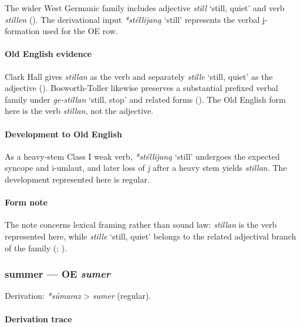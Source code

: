 \documentclass[
  british,
  a4paper,
]{article}
\providecommand{\Recon}[1]{\emph{*#1}}
\begin{document}
The wider West Germanic family includes adjective {\emph{still}} `still,
quiet' and verb \emph{stillen} (). The derivational input \Recon{stéllijaną} `still' represents the
verbal j-formation used for the OE row.

\paragraph{Old English evidence}\label{old-english-evidence-54}

Clark Hall gives \emph{stillan} as the verb and separately
{\emph{stille}} `still, quiet' as the adjective
(). Bosworth-Toller
likewise preserves a substantial prefixed verbal family under
\emph{ge-stillan} `still, stop' and related forms
(). The
Old English form here is the verb \emph{stillan}, not the adjective.

\paragraph{Development to Old
English}\label{development-to-old-english-54}

As a heavy-stem Class I weak verb, \Recon{stéllijaną} `still' undergoes
the expected syncope and i-umlaut, and later loss of \emph{j} after a
heavy stem yields \emph{stillan}. The development represented here is
regular.

\paragraph{Form note}\label{form-note-20}

The note concerns lexical framing rather than sound law: \emph{stillan}
is the verb represented here, while {\emph{stille}} `still, quiet'
belongs to the related adjectival branch of the family
(;
).

\subsubsection{\texorpdfstring{summer --- OE
\emph{sumer}}{summer --- OE sumer}}\label{summer-oe-sumer}

Derivation: \emph{*súmaraz} \textgreater{} \emph{sumer} (regular).

\paragraph{Derivation trace}\label{derivation-trace-59}
\end{document}
